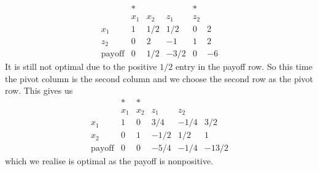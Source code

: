 \begin{example}
$$\begin{array}{c|cccc|c}
        &\ast&&&\ast&\\
        &x_1&x_2&z_1&z_2&\\ \hline
        x_1&1&1/2&1/2&0&2\\
        z_2&0&2&-1&1&2\\ \hline
        \text{payoff}&0&1/2&-3/2&0&-6
    \end{array}$$
    It is still not optimal due to the positive $1/2$ entry in the payoff row.
    So this time the pivot column is the second column and we choose the second row as the pivot row.
    This gives us
    $$\begin{array}{c|cccc|c}
        &\ast&\ast&&&\\
        &x_1&x_2&z_1&z_2&\\ \hline
        x_1&1&0&3/4&-1/4&3/2\\
        x_2&0&1&-1/2&1/2&1\\ \hline
        \text{payoff}&0&0&-5/4&-1/4&-13/2
    \end{array}$$
    which we realise is optimal as the payoff is nonpositive.
\end{example}
